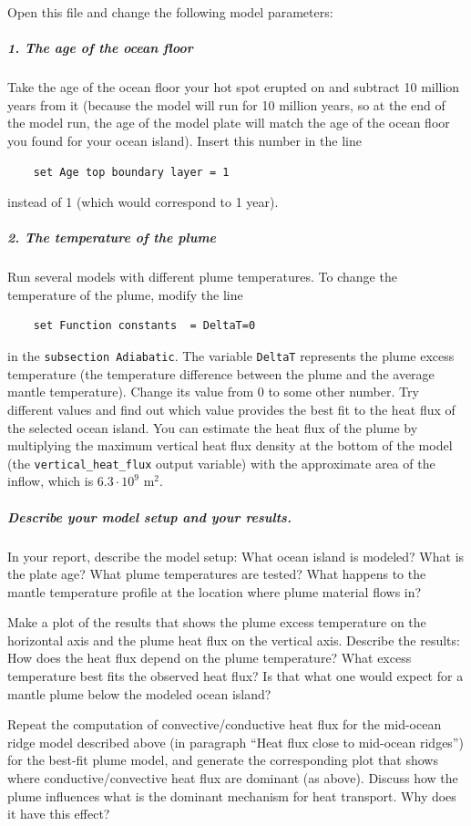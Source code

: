 Open this file and change the following model parameters:

\subparagraph{1. The age of the ocean floor}
Take the age of the ocean floor your hot spot erupted on and subtract 10 million years from it (because the model will run for 10 million years, so at the end of the model run, the age of the model plate will match the age of the ocean floor you found for your ocean island). 
Insert this number in the line

\begin{verbatim}
    set Age top boundary layer = 1
\end{verbatim}

instead of 1 (which would correspond to 1 year). 

\subparagraph{2. The temperature of the plume}
Run several models with different plume temperatures. To change the temperature of the plume, modify the line

\begin{verbatim}
    set Function constants  = DeltaT=0
\end{verbatim}

in the \texttt{subsection Adiabatic}. The variable \texttt{DeltaT} represents the plume excess temperature (the temperature difference between the plume and the average mantle temperature). Change its value from 0 to some other number. Try different values and find out which value provides the best fit to the heat flux of the selected ocean island. You can estimate the heat flux of the plume by multiplying the maximum vertical heat flux density at the bottom of the model (the \texttt{vertical\_heat\_flux} output variable) with the approximate area of the inflow, which is $6.3 \cdot 10^9$ m$^2$. 

\subparagraph{Describe your model setup and your results.}
In your report, describe the model setup: What ocean island is modeled? What is the plate age? What plume temperatures are tested? What happens to the mantle temperature profile at the location where plume material flows in?

Make a plot of the results that shows the plume excess temperature on the horizontal axis and the plume heat flux on the vertical axis. Describe the results: How does the heat flux depend on the plume temperature? What excess temperature best fits the observed heat flux? Is that what one would expect for a mantle plume below the modeled ocean island? 

Repeat the computation of convective/conductive heat flux for the mid-ocean ridge model described above (in paragraph ``Heat flux close to mid-ocean ridges'') for the best-fit plume model, 
and generate the corresponding plot that shows where conductive/convective heat flux are dominant (as above). Discuss how the plume influences what is the dominant mechanism for heat transport. Why does it have this effect?

